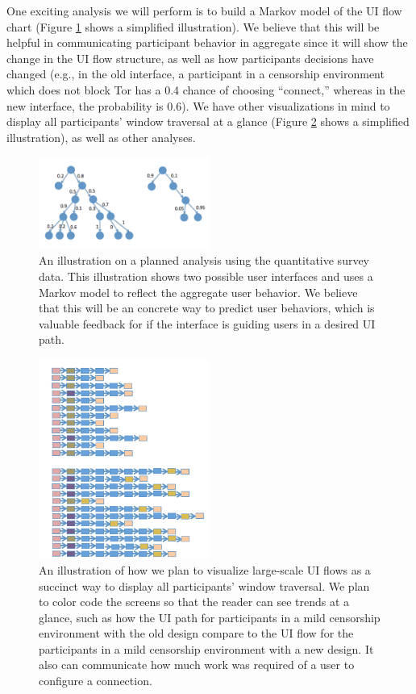\documentclass{template}
\begin{document}
One exciting analysis we will perform is to build a Markov model of the UI flow chart (Figure \ref{fig:markov} shows a simplified illustration). We believe that this will be helpful in communicating participant behavior in aggregate since it will show the change in the UI flow structure, as well as how participants decisions have changed (e.g., in the old interface, a participant in a censorship environment which does not block Tor has a 0.4 chance of choosing ``connect,'' whereas in the new interface, the probability is 0.6). We have other visualizations in mind to display all participants' window traversal at a glance (Figure \ref{fig:bar} shows a simplified illustration), as well as other analyses.\\

\begin{figure}[t]
  \centering
    \includegraphics[width=0.5\textwidth]{markov.png}
    \caption{An illustration on a planned analysis using the quantitative survey data. This illustration shows two possible user interfaces and uses a Markov model to reflect the aggregate user behavior. We believe that this will be an concrete way to predict user behaviors, which is valuable feedback for if the interface is guiding users in a desired UI path.}
\label{fig:markov}
\end{figure}

\begin{figure}[t]
  \centering
    \includegraphics[width=0.5\textwidth]{screen-bar.png}
    \caption{An illustration of how we plan to visualize large-scale UI flows as a succinct way to display all participants' window traversal. We plan to color code the screens so that the reader can see trends at a glance, such as how the UI path for participants in a mild censorship environment with the old design compare to the UI flow for the participants in a mild censorship environment with a new design. It also can communicate how much work was required of a user to configure a connection.}
\label{fig:bar}
\end{figure}
\end{document}
